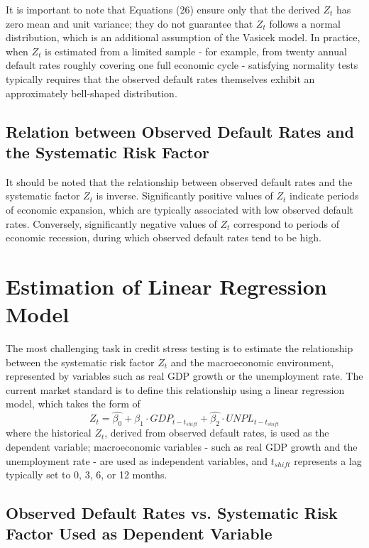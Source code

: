 \documentclass[11pt,a4paper]{article}
\begin{document}
It is important to note that Equations (26) ensure only that the derived $Z_t$ has zero mean and unit variance; they do not guarantee that 
$Z_t$ follows a normal distribution, which is an additional assumption of the Vasicek model. In practice, when $Z_t$ is estimated from a limited sample - for example, from twenty annual default rates roughly covering one full economic cycle - satisfying normality tests typically requires that the observed default rates themselves exhibit an approximately bell-shaped distribution.

\subsection{Relation between Observed Default Rates and the Systematic Risk Factor}

It should be noted that the relationship between observed default rates and the systematic factor $Z_t$ is inverse. Significantly positive values of $Z_t$ indicate periods of economic expansion, which are typically associated with low observed default rates. Conversely, significantly negative values of $Z_t$ correspond to periods of economic recession, during which observed default rates tend to be high.

\section{Estimation of Linear Regression Model}

The most challenging task in credit stress testing is to estimate the relationship between the systematic risk factor $Z_t$ and the macroeconomic environment, represented by variables such as real GDP growth or the unemployment rate. The current market standard is to define this relationship using a linear regression model, which takes the form of
\begin{equation}
Z_t = \widehat{\beta_0} + \widehat{\beta_1} \cdot GDP_{t - t_{shift}} + \widehat{\beta_2} \cdot UNPL_{t - t_{shift}}
\end{equation}
where the historical $Z_t$, derived from observed default rates, is used as the dependent variable; macroeconomic variables - such as real GDP growth and the unemployment rate - are used as independent variables, and $t_{shift}$ represents a lag typically set to 0, 3, 6, or 12 months.

\subsection{Observed Default Rates vs. Systematic Risk Factor Used as Dependent Variable}
\end{document}
